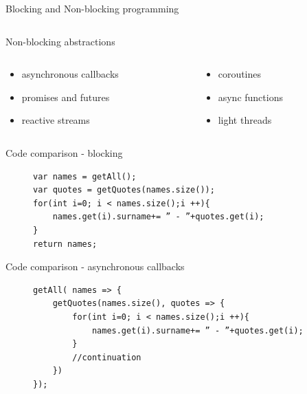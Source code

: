 \documentclass{beamer}
\begin{document}
\begin{frame}{Blocking and Non-blocking programming}
\begin{columns}
\begin{column}{0.5\textwidth}
        \end{column}
    \end{columns}
\end{frame}
\begin{frame}{Non-blocking abstractions}
    \begin{columns}
        \begin{column}{0.5\textwidth}
            \begin{itemize}
                \item asynchronous callbacks
                \item promises and futures
                \item reactive streams
            \end{itemize}
        \end{column}
        \begin{column}{0.5\textwidth}
            \begin{itemize}
                \item coroutines
                \item async functions
                \item light threads
            \end{itemize}
        \end{column}
    \end{columns}
\end{frame}
\begin{frame}[fragile]{Code comparison - blocking}
    \begin{figure}
        \begin{lstlisting}
var names = getAll();
var quotes = getQuotes(names.size());
for(int i=0; i < names.size();i ++){
    names.get(i).surname+= ” - ”+quotes.get(i);
}
return names;
        \end{lstlisting}
    \end{figure}
\end{frame}
\begin{frame}[fragile]{Code comparison - asynchronous callbacks}
    \begin{figure}
        \begin{lstlisting}
getAll( names => {
    getQuotes(names.size(), quotes => {
        for(int i=0; i < names.size();i ++){
            names.get(i).surname+= ” - ”+quotes.get(i);
        }
        //continuation
    })
});
        \end{lstlisting}
    \end{figure}
\end{frame}
\end{document}
